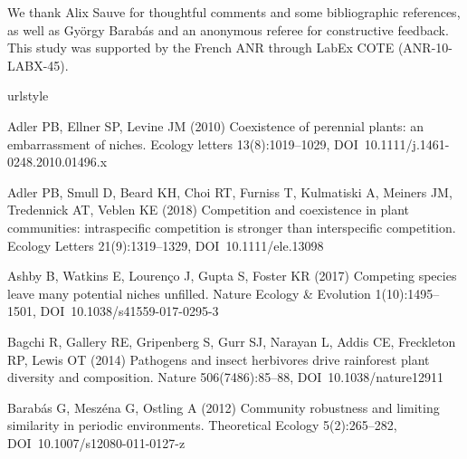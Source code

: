 \documentclass[smallcondensed,referee]{svjour3}       %
\begin{document}
\begin{acknowledgements} 
We thank Alix Sauve for thoughtful comments and some bibliographic
references, as well as Gy\"orgy Barab\'as and an anonymous referee for
constructive feedback. This study was supported by the French ANR
through LabEx COTE (ANR-10-LABX-45).
\end{acknowledgements}
% 
\begin{thebibliography}{56}
\providecommand{\natexlab}[1]{#1}
\providecommand{\url}[1]{{#1}}
\providecommand{\urlprefix}{URL }
\expandafter\ifx\csname urlstyle\endcsname\relax
  \providecommand{\doi}[1]{DOI~\discretionary{}{}{}#1}\else
  \providecommand{\doi}{DOI~\discretionary{}{}{}\begingroup
  \urlstyle{rm}\Url}\fi
\providecommand{\eprint}[2][]{\url{#2}}

Adler PB, Ellner SP, Levine JM (2010) Coexistence of perennial plants: an
  embarrassment of niches. Ecology letters 13(8):1019--1029,
  \doi{10.1111/j.1461-0248.2010.01496.x}

Adler PB, Smull D, Beard KH, Choi RT, Furniss T, Kulmatiski A, Meiners JM,
  Tredennick AT, Veblen KE (2018) Competition and coexistence in plant
  communities: intraspecific competition is stronger than interspecific
  competition. Ecology Letters 21(9):1319--1329, \doi{10.1111/ele.13098}

Ashby B, Watkins E, Louren\c{c}o J, Gupta S, Foster KR (2017) Competing species
  leave many potential niches unfilled. Nature Ecology \& Evolution
  1(10):1495--1501, \doi{10.1038/s41559-017-0295-3}

Bagchi R, Gallery RE, Gripenberg S, Gurr SJ, Narayan L, Addis CE, Freckleton
  RP, Lewis OT (2014) Pathogens and insect herbivores drive rainforest plant
  diversity and composition. Nature 506(7486):85--88, \doi{10.1038/nature12911}

Barab\'as G, Mesz\'ena G, Ostling A (2012) Community robustness and limiting
  similarity in periodic environments. Theoretical Ecology 5(2):265--282,
  \doi{10.1007/s12080-011-0127-z}


\end{thebibliography}
\end{document}
